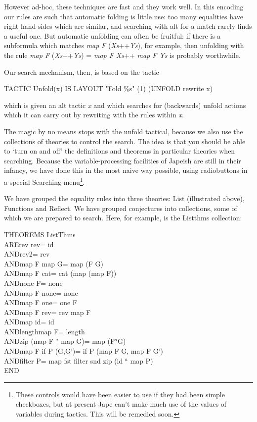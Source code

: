 \documentclass[11pt]{book}
\newcommand{\tab}{\hspace{5mm}}
\begin{document}
However ad-hoc, these techniques are fast and they work well. In this encoding our rules are such that automatic folding is little use: too many equalities have right-hand sides which are similar, and searching with alt for a match rarely finds a useful one. But automatic unfolding can often be fruitful: if there is a subformula which matches \textit{map} \textit{F} (\textit{Xs}++\textit{Ys}), for example, then unfolding with the rule \textit{map F} (\textit{Xs}++\textit{Ys}) = \textit{map F Xs}++ \textit{map F Ys} is probably worthwhile.


Our search mechanism, then, is based on the tactic

TACTIC Unfold(x) IS LAYOUT "Fold \%s" (1) (UNFOLD rewrite x)


which is given an alt tactic \textit{x} and which searches for (backwards) unfold actions which it can carry out by rewriting with the rules within \textit{x}.


The magic by no means stops with the unfold tactical, because we also use the collections of theories to control the search. The idea is that you should be able to `turn on and off' the definitions and theorems in particular theories when searching. Because the variable-processing facilities of Japeish are still in their infancy, we have done this in the most naive way possible, using radiobuttons in a special Searching menu\footnote{These controls would have been easier to use if they had been simple checkboxes, but at present Jape can't make much use of the values of variables during tactics. This will be remedied soon.}.


We have grouped the equality rules into three theories: List (illustrated above), Functions and Reflect. We have grouped conjectures into collections, some of which we are prepared to search. Here, for example, is the Listthms collection:

THEOREMS ListThms\\
ARE\tab rev {\textbullet} rev\tab = id\\
AND\tab rev2\tab  = rev\\
AND\tab map F {\textbullet} map G\tab = map (F {\textbullet} G)\\
AND\tab map F {\textbullet} cat\tab = cat {\textbullet} (map (map F))\\
AND\tab none {\textbullet} F\tab = none\\
AND\tab map F {\textbullet} none\tab = none\\
AND\tab map F {\textbullet} one\tab = one {\textbullet} F\\
AND\tab map F {\textbullet} rev\tab = rev {\textbullet} map F\\
AND\tab map id\tab = id\\
AND\tab length{\textbullet}map F\tab = length\\
AND\tab zip {\textbullet} (map F \ensuremath{^a} map G)\tab = map (F\ensuremath{^a}G)\\
AND\tab map F {\textbullet} if P (G,G')\tab = if P (map F {\textbullet} G, map F {\textbullet} G')\\
AND\tab filter P\tab = map fst {\textbullet} filter snd {\textbullet} zip {\textbullet} (id \ensuremath{^a} map P)\\
END
\end{document}

